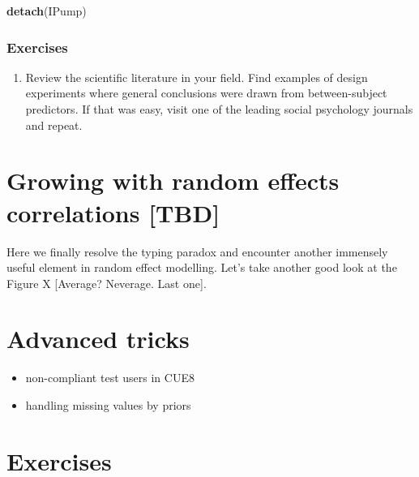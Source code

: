 \documentclass[]{svmono}
\newenvironment{Shaded}{\begin{snugshade}}{\end{snugshade}}
\newcommand{\KeywordTok}[1]{\textcolor[rgb]{0.13,0.29,0.53}{\textbf{#1}}}
\newcommand{\NormalTok}[1]{#1}
\providecommand{\tightlist}{%
  \setlength{\itemsep}{0pt}\setlength{\parskip}{0pt}}
\begin{document}
\begin{Shaded}
\begin{Highlighting}[]
\KeywordTok{detach}\NormalTok{(IPump)}
\end{Highlighting}
\end{Shaded}

\subsubsection{}\label{section}

\subsubsection{Exercises}\label{exercises-6}

\begin{enumerate}
\def\labelenumi{\arabic{enumi}.}
\tightlist
\item
  Review the scientific literature in your field. Find examples of
  design experiments where general conclusions were drawn from
  between-subject predictors. If that was easy, visit one of the leading
  social psychology journals and repeat.
\end{enumerate}

\section{Growing with random effects correlations
{[}TBD{]}}\label{re_correlations}

Here we finally resolve the typing paradox and encounter another
immensely useful element in random effect modelling. Let's take another
good look at the Figure X {[}Average? Neverage. Last one{]}.

\section{Advanced tricks}\label{advanced-tricks}

\begin{itemize}
\tightlist
\item
  non-compliant test users in CUE8
\item
  handling missing values by priors
\end{itemize}

\section{Exercises}\label{exercises-7}
\end{document}
